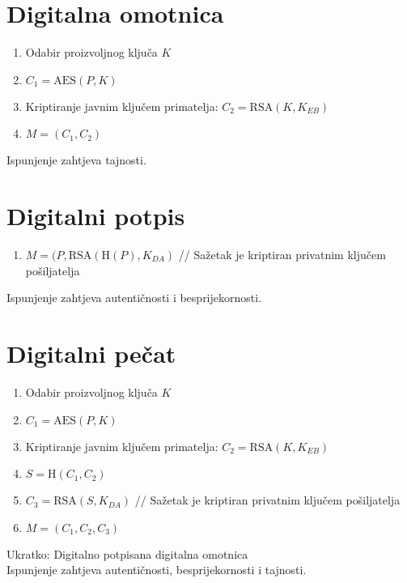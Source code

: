 \documentclass[11pt]{article}
\begin{document}
\section{Digitalna omotnica}
\begin{enumerate}
  \item Odabir proizvoljnog ključa $K$
  \item $C_1 = \text{AES}(P, K)$
  \item Kriptiranje javnim ključem primatelja: $C_2 = \text{RSA}(K, K_{EB})$
  \item $M = (C_1, C_2)$
\end{enumerate}
Ispunjenje zahtjeva tajnosti.

\section{Digitalni potpis}
\begin{enumerate}
  \item $M = (P, \text{RSA}(\text{H}(P), K_{DA})$ // Sažetak je kriptiran privatnim ključem pošiljatelja
\end{enumerate}
Ispunjenje zahtjeva autentičnosti i besprijekornosti.

\section{Digitalni pečat}
\begin{enumerate}
  \item Odabir proizvoljnog ključa $K$
  \item $C_1 = \text{AES}(P, K)$
  \item Kriptiranje javnim ključem primatelja: $C_2 = \text{RSA}(K, K_{EB})$
  \item $S = \text{H}(C_1, C_2)$
  \item $C_3 = \text{RSA}(S, K_{DA})$ // Sažetak je kriptiran privatnim ključem pošiljatelja
  \item $M = (C_1, C_2, C_3)$
\end{enumerate}
Ukratko: Digitalno potpisana digitalna omotnica\\
Ispunjenje zahtjeva autentičnosti, besprijekornosti i tajnosti.
\end{document}
